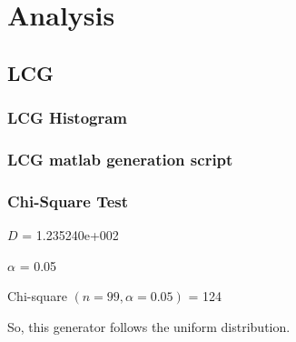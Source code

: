 \documentclass[aps,letterpaper,10pt]{revtex4}
\begin{document}
\section{Analysis}
    \subsection{LCG}
        \subsubsection{LCG Histogram}
            \begin{figure}[htp]
                \begin{center}
                \end{center}
            \end{figure}
        \subsubsection{LCG matlab generation script}
            
        \subsubsection{Chi-Square Test}
            $D$ = 1.235240e+002

            $\alpha$ = 0.05

            Chi-square $(n=99,\alpha = 0.05)$ = 124

            So, this generator follows the uniform distribution.
\end{document}
